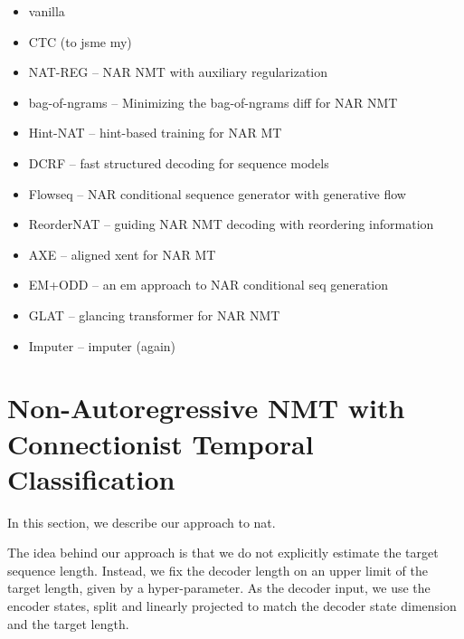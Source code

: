 


\begin{itemize}
\item vanilla \citep{gu2017nonautoregressive}
\item CTC (to jsme my)
\item NAT-REG \citep{wang2019nonautoregressive} -- NAR NMT with auxiliary regularization
\item bag-of-ngrams \citep{shao2020minimizing} -- Minimizing the bag-of-ngrams diff for NAR NMT
\item Hint-NAT \citep{li2019hint} -- hint-based training for NAR MT
\item DCRF \citep{sun2019fast} -- fast structured decoding for sequence models
\item Flowseq \citep{ma2019flowseq} -- NAR conditional sequence generator with generative flow
\item ReorderNAT \citep{ran2019guiding} -- guiding NAR NMT decoding with reordering information
\item AXE \citep{ghazvininejad2020aligned} -- aligned xent for NAR MT
\item EM+ODD \citep{sun2020em} -- an em approach to NAR conditional seq generation
\item GLAT \citep{qian2020glancing} -- glancing transformer for NAR NMT
\item Imputer \citep{saharia2020nonautoregressive} -- imputer (again)
\end{itemize}

\section{Non-Autoregressive NMT with Connectionist Temporal Classification}
\label{sec:nat-ctc}


In this section, we describe our approach to \acrlong{nat}.

The idea behind our approach is that we do not explicitly estimate the target
sequence length. Instead, we fix the decoder length on an upper limit of the
target length, given by a hyper-parameter. As the decoder input, we use the
encoder states, split and linearly projected to match the decoder state
dimension and the target length.


